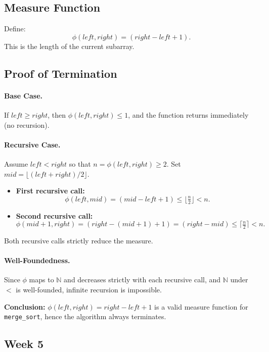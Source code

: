 \documentclass{article}
\theoremstyle{theorem}
\theoremstyle{definition}
\theoremstyle{remark}
\begin{document}
\subsection*{Measure Function}
Define:
\[
\phi(left, right) = (right - left + 1).
\]
This is the length of the current subarray.

\subsection*{Proof of Termination}
\paragraph{Base Case.}  
If $left \geq right$, then $\phi(left, right) \leq 1$, and the function returns immediately (no recursion).

\paragraph{Recursive Case.}  
Assume $left < right$ so that $n = \phi(left, right) \geq 2$.  
Set $mid = \lfloor (left + right)/2 \rfloor$.

\begin{itemize}
    \item \textbf{First recursive call:}  
    \[
    \phi(left, mid) = (mid - left + 1) \leq \Big\lfloor \tfrac{n}{2} \Big\rfloor < n.
    \]
    \item \textbf{Second recursive call:}  
    \[
    \phi(mid+1, right) = (right - (mid+1) + 1) = (right - mid) \leq \Big\lceil \tfrac{n}{2} \Big\rceil < n.
    \]
\end{itemize}
Both recursive calls strictly reduce the measure.

\paragraph{Well-Foundedness.}  
Since $\phi$ maps to $\mathbb{N}$ and decreases strictly with each recursive call, and $\mathbb{N}$ under $<$ is well-founded, infinite recursion is impossible.

\noindent \textbf{Conclusion:} $\phi(left, right) = right - left + 1$ is a valid measure function for \texttt{merge\_sort}, hence the algorithm always terminates.

\subsection{Week 5}
\end{document}
